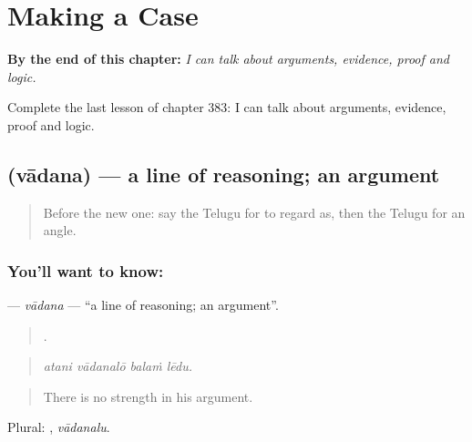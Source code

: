
\chapter{Making a Case}
\label{ch:te-making-a-case}

\begin{chapteropening}
\textbf{By the end of this chapter:} \emph{I can talk about arguments, evidence, proof and logic.}

Complete the last lesson of chapter 383: I can talk about arguments, evidence, proof and logic.
\end{chapteropening}

\section[\texorpdfstring{\te{వాదన} (vādana)}{వాదన (vādana)}]{ (vādana) — a line of reasoning; an argument}

\label{lesson:TE-C383-vadana}



\begin{quote}
Before the new one: say the Telugu for to regard as, then the Telugu for an angle.
\end{quote}

\subsection*{You'll want to know: }
\textbf{} — \emph{vādana} — \textquotedblleft{}a line of reasoning; an argument\textquotedblright{}.

\begin{quote}
   .
\end{quote}

\begin{quote}
\emph{atani vādanalō balaṁ lēdu.}
\end{quote}

\begin{quote}
There is no strength in his argument.
\end{quote}

Plural: , \emph{vādanalu}.

